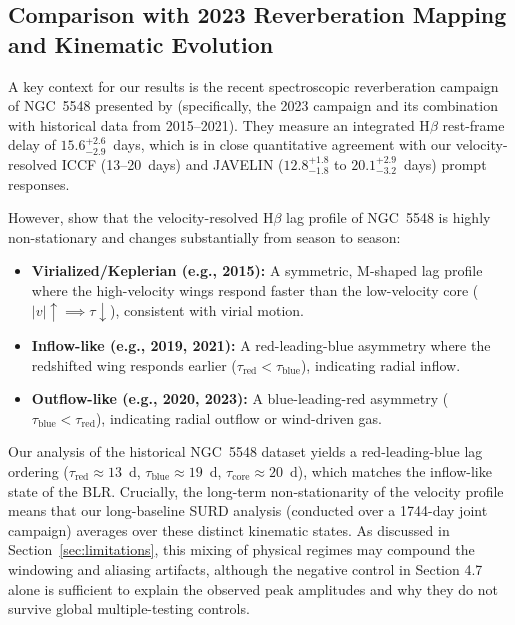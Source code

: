 \documentclass[fleqn,usenatbib]{mnras}
\begin{document}
\subsection{Comparison with 2023 Reverberation Mapping and Kinematic Evolution}
\label{sec:comparison_xi}

A key context for our results is the recent spectroscopic reverberation campaign of NGC~5548 presented by \citet{LongDexter2025} (specifically, the 2023 campaign and its combination with historical data from 2015--2021). They measure an integrated H\(\beta\) rest-frame delay of \(15.6_{-2.9}^{+2.6}\)~days, which is in close quantitative agreement with our velocity-resolved ICCF (13--20~days) and JAVELIN (\(12.8_{-1.8}^{+1.8}\) to \(20.1_{-3.2}^{+2.9}\)~days) prompt responses. 

However, \citet{LongDexter2025} show that the velocity-resolved H\(\beta\) lag profile of NGC~5548 is highly non-stationary and changes substantially from season to season:
\begin{itemize}
    \item \textbf{Virialized/Keplerian (e.g., 2015):} A symmetric, M-shaped lag profile where the high-velocity wings respond faster than the low-velocity core ($|v| \uparrow \implies \tau \downarrow$), consistent with virial motion.
    \item \textbf{Inflow-like (e.g., 2019, 2021):} A red-leading-blue asymmetry where the redshifted wing responds earlier ($\tau_{\mathrm{red}} < \tau_{\mathrm{blue}}$), indicating radial inflow.
    \item \textbf{Outflow-like (e.g., 2020, 2023):} A blue-leading-red asymmetry ($\tau_{\mathrm{blue}} < \tau_{\mathrm{red}}$), indicating radial outflow or wind-driven gas.
\end{itemize}
Our analysis of the historical NGC~5548 dataset yields a red-leading-blue lag ordering (\(\tau_{\mathrm{red}} \approx 13\)~d, \(\tau_{\mathrm{blue}} \approx 19\)~d, \(\tau_{\mathrm{core}} \approx 20\)~d), which matches the inflow-like state of the BLR. Crucially, the long-term non-stationarity of the velocity profile means that our long-baseline SURD analysis (conducted over a 1744-day joint campaign) averages over these distinct kinematic states. As discussed in Section~\ref{sec:limitations}, this mixing of physical regimes may compound the windowing and aliasing artifacts, although the negative control in Section 4.7 alone is sufficient to explain the observed peak amplitudes and why they do not survive global multiple-testing controls.
\end{document}
